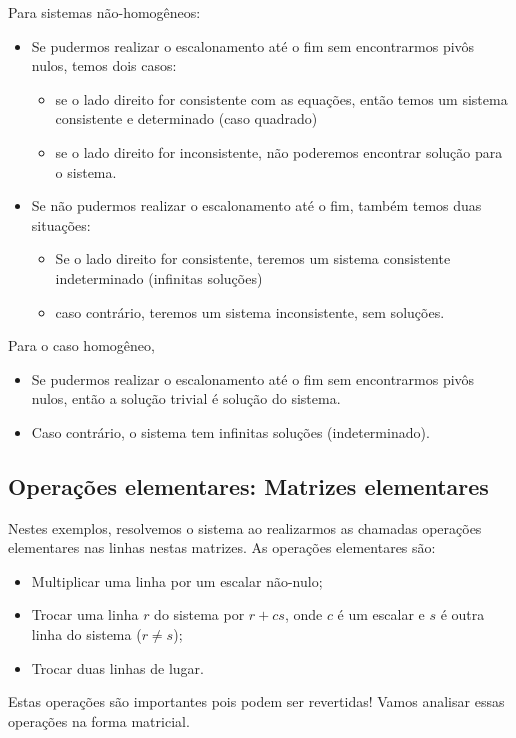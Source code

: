 Para sistemas não-homogêneos:
\begin{itemize}
   \item Se pudermos realizar o escalonamento até o fim sem encontrarmos pivôs nulos, temos dois casos:
	\begin{itemize} 
		\item se o lado direito for consistente com as equações,
então temos um sistema consistente e determinado (caso quadrado)
		\item se o lado direito for inconsistente, não poderemos encontrar solução para o sistema.
	\end{itemize}
	\item Se não pudermos realizar o escalonamento até o fim, também temos duas situações:
	\begin{itemize}
		\item Se o lado direito for consistente, teremos um sistema consistente indeterminado (infinitas soluções)
		\item caso contrário, teremos um sistema inconsistente, sem soluções.
	\end{itemize}
\end{itemize}
Para o caso homogêneo,
\begin{itemize}
   \item Se pudermos realizar o escalonamento até o fim sem encontrarmos pivôs nulos, então a solução trivial é solução do sistema.
	\item Caso contrário, o sistema tem infinitas soluções (indeterminado).
\end{itemize}

\subsection{Operações elementares: Matrizes elementares} 

Nestes exemplos, resolvemos o sistema ao realizarmos as chamadas operações elementares nas linhas nestas matrizes. As operações elementares são:

\begin{itemize}
   \item Multiplicar uma linha por um escalar não-nulo;
   \item Trocar uma linha $r$ do sistema por $r+cs$, onde $c$ é um escalar e $s$ é outra linha do sistema ($r\ne s$);
   \item Trocar duas linhas de lugar.
\end{itemize}

Estas operações são importantes pois podem ser revertidas! Vamos analisar essas operações na forma matricial.

